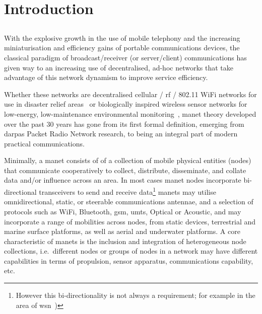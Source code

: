 
\chapter{Introduction}
\label{ch:introduction}

\section{}\label{manets}

With the explosive growth in the use of mobile telephony and the increasing miniaturisation and efficiency gains of portable communications devices, the classical paradigm of broadcast/receiver (or server/client) communications has given way to an increasing use of decentralised, ad-hoc networks that take advantage of this network dynamism to improve service efficiency.

Whether these networks are decentralised cellular / \gls{rf} / 802.11 WiFi networks for use in disaster relief areas~\cite{Milliken2015} or biologically inspired wireless sensor networks for low-energy, low-maintenance environmental monitoring~\cite{Nicholson2008,Selvakennedy2007}, \gls{manet} theory developed over the past 30 years has gone from its first formal definition, emerging from \glspl{darpa} Packet Radio Network research, to being an integral part of modern practical communications\cite{Jubin1987}.

Minimally, a \gls{manet} consists of of a collection of mobile physical entities (nodes) that communicate cooperatively to collect, distribute, disseminate, and collate data and/or influence across an area.
In most cases \gls{manet} nodes incorporate bi-directional transceivers to send and receive data\footnote{However this bi-directionality is not always a requirement; for example in the area of \gls{wsn}~\cite{Akyildiz2002})}
\glspl{manet} may utilise omnidirectional, static, or steerable communications antennae, and a selection of protocols such as WiFi, Bluetooth, \gls{gsm}, \gls{umts}, Optical or Acoustic, and may incorporate a range of mobilities across nodes, from static devices, terrestrial and marine surface platforms, as well as aerial and underwater platforms.
A core characteristic of \glspl{manet} is the inclusion and integration of heterogeneous node collections, i.e.\ different nodes or groups of nodes in a network may have different capabilities in terms of propulsion, sensor apparatus, communications capability, etc.

